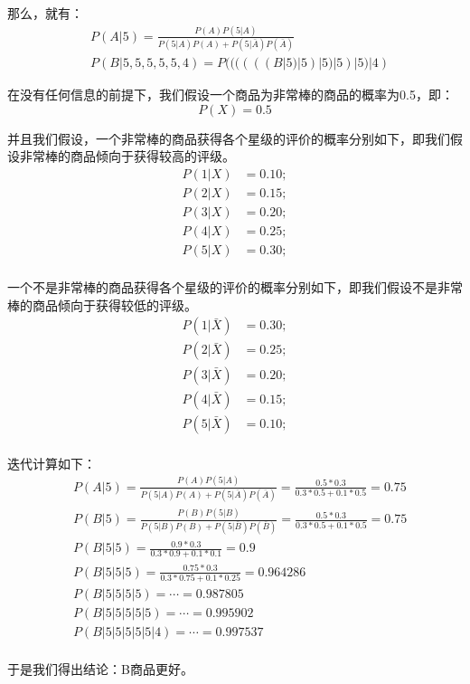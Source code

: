 \documentclass[12pt]{article}
\begin{document}
那么，就有：
\begin{align*}
&P(A|5) = \frac{P(A)P(5|A)}{P(5|A)P(A) + P(5|\bar{A})P(\bar{A})} \\
&P(B|5,5,5,5,5,4) = P((((((B|5)|5)|5)|5)|5)|4)
\end{align*}

在没有任何信息的前提下，我们假设一个商品为非常棒的商品的概率为0.5，即：
$$
P(X) = 0.5
$$

并且我们假设，一个非常棒的商品获得各个星级的评价的概率分别如下，即我们假设非常棒的商品倾向于获得较高的评级。
\begin{align*}
P(1|X) &= 0.10; \\
P(2|X) &= 0.15; \\
P(3|X) &= 0.20; \\
P(4|X) &= 0.25; \\
P(5|X) &= 0.30; \\
\end{align*}

一个不是非常棒的商品获得各个星级的评价的概率分别如下，即我们假设不是非常棒的商品倾向于获得较低的评级。
\begin{align*}
P(1|\bar{X}) &= 0.30; \\
P(2|\bar{X}) &= 0.25; \\
P(3|\bar{X}) &= 0.20; \\
P(4|\bar{X}) &= 0.15; \\
P(5|\bar{X}) &= 0.10; \\
\end{align*}

迭代计算如下：
\begin{align*}
& P(A|5) = \frac{P(A)P(5|A)}{P(5|A)P(A) + P(5|\bar{A})P(\bar{A})} = \frac{0.5*0.3}{0.3*0.5+0.1*0.5} = 0.75 \\
& P(B|5) =  \frac{P(B)P(5|B)}{P(5|B)P(B) + P(5|\bar{B})P(\bar{B})} = \frac{0.5*0.3}{0.3*0.5+0.1*0.5} = 0.75 \\
& P(B|5|5) = \frac{0.9*0.3}{0.3*0.9+0.1*0.1} = 0.9 \\
& P(B|5|5|5) = \frac{0.75*0.3}{0.3*0.75+0.1*0.25} = 0.964286 \\
& P(B|5|5|5|5) = \cdots = 0.987805 \\
& P(B|5|5|5|5|5) = \cdots = 0.995902 \\
& P(B|5|5|5|5|5|4) = \cdots = 0.997537 \\
\end{align*}

于是我们得出结论：B商品更好。



\end{document}
